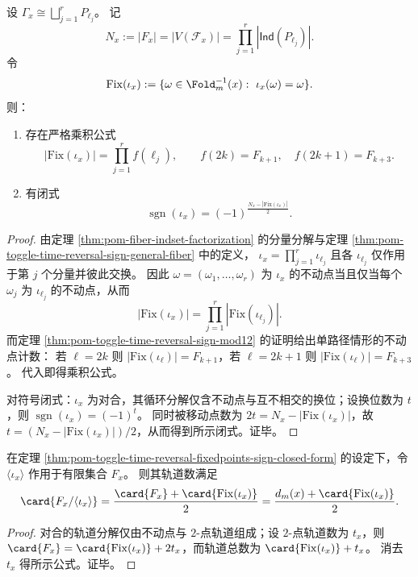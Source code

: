 \begin{theorem}[时间反演的不动点乘积公式与符号闭式]\label{thm:pom-toggle-time-reversal-fixedpoints-sign-closed-form}
设 \(\Gamma_x\cong\bigsqcup_{j=1}^r P_{\ell_j}\)。
记
\[
N_x:=|F_x|=|V(\mathcal F_x)|=\prod_{j=1}^r |\mathsf{Ind}(P_{\ell_j})|.
\]
令
\[
\mathrm{Fix}(\iota_x):=\{\omega\in \Fold_m^{-1}(x):\ \iota_x(\omega)=\omega\}.
\]
则：
\begin{enumerate}
  \item 存在严格乘积公式
  \[
  |\mathrm{Fix}(\iota_x)|=\prod_{j=1}^r f(\ell_j),
  \qquad
  f(2k)=F_{k+1},\quad f(2k+1)=F_{k+3}.
  \]
  \item 有闭式
  \[
  \operatorname{sgn}(\iota_x)=(-1)^{\frac{N_x-|\mathrm{Fix}(\iota_x)|}{2}}.
  \]
\end{enumerate}
\end{theorem}
\begin{proof}
由定理 \ref{thm:pom-fiber-indset-factorization} 的分量分解与定理 \ref{thm:pom-toggle-time-reversal-sign-general-fiber} 中的定义，
\(
\iota_x=\prod_{j=1}^r \iota_{\ell_j}
\)
且各 \(\iota_{\ell_j}\) 仅作用于第 \(j\) 个分量并彼此交换。
因此 \(\omega=(\omega_1,\dots,\omega_r)\) 为 \(\iota_x\) 的不动点当且仅当每个 \(\omega_j\) 为 \(\iota_{\ell_j}\) 的不动点，从而
\[
|\mathrm{Fix}(\iota_x)|=\prod_{j=1}^r |\mathrm{Fix}(\iota_{\ell_j})|.
\]
而定理 \ref{thm:pom-toggle-time-reversal-sign-mod12} 的证明给出单路径情形的不动点计数：
若 \(\ell=2k\) 则 \(|\mathrm{Fix}(\iota_\ell)|=F_{k+1}\)，若 \(\ell=2k+1\) 则 \(|\mathrm{Fix}(\iota_\ell)|=F_{k+3}\)。
代入即得乘积公式。
\par
对符号闭式：\(\iota_x\) 为对合，其循环分解仅含不动点与互不相交的换位；设换位数为 \(t\)，则 \(\operatorname{sgn}(\iota_x)=(-1)^t\)。
同时被移动点数为 \(2t=N_x-|\mathrm{Fix}(\iota_x)|\)，故 \(t=(N_x-|\mathrm{Fix}(\iota_x)|)/2\)，从而得到所示闭式。证毕。
\end{proof}

\begin{corollary}[时间反演对合的轨道数闭式]\label{cor:pom-time-reversal-orbit-count}
在定理 \ref{thm:pom-toggle-time-reversal-fixedpoints-sign-closed-form} 的设定下，令 \(\langle \iota_x\rangle\) 作用于有限集合 \(F_x\)。
则其轨道数满足
\[
\card{F_x/\langle \iota_x\rangle}
=\frac{\card{F_x}+\card{\mathrm{Fix}(\iota_x)}}{2}
=\frac{d_m(x)+\card{\mathrm{Fix}(\iota_x)}}{2}.
\]
\end{corollary}

\begin{proof}
对合的轨道分解仅由不动点与 \(2\)-点轨道组成；设 \(2\)-点轨道数为 \(t_x\)，则
\(
\card{F_x}=\card{\mathrm{Fix}(\iota_x)}+2t_x
\)，而轨道总数为 \(\card{\mathrm{Fix}(\iota_x)}+t_x\)。
消去 \(t_x\) 得所示公式。证毕。
\end{proof}

